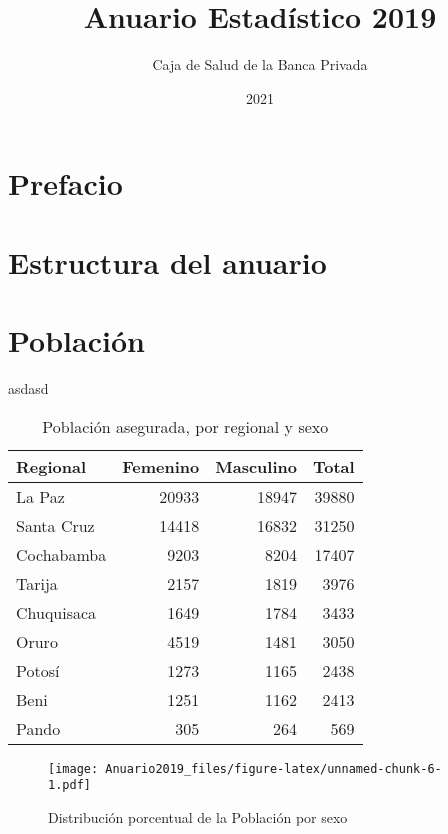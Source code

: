 \documentclass[
]{book}
\title{Anuario Estadístico 2019}
\author{Caja de Salud de la Banca Privada}
\date{2021}
\begin{document}
\maketitle

{
\setcounter{tocdepth}{1}
\tableofcontents
}
\hypertarget{prefacio}{%
\chapter*{Prefacio}\label{prefacio}}

\hypertarget{estructura-del-anuario}{%
\chapter*{Estructura del anuario}\label{estructura-del-anuario}}

\hypertarget{poblaciuxf3n}{%
\chapter{Población}\label{poblaciuxf3n}}

asdasd

\begin{table}

\caption{\label{tab:unnamed-chunk-4}Población asegurada, por regional y sexo}
\centering
\begin{tabular}[t]{lrrr}
\toprule
Regional & Femenino & Masculino & Total\\
\midrule
La Paz & 20933 & 18947 & 39880\\
Santa Cruz & 14418 & 16832 & 31250\\
Cochabamba & 9203 & 8204 & 17407\\
Tarija & 2157 & 1819 & 3976\\
Chuquisaca & 1649 & 1784 & 3433\\
\addlinespace
Oruro & 4519 & 1481 & 3050\\
Potosí & 1273 & 1165 & 2438\\
Beni & 1251 & 1162 & 2413\\
Pando & 305 & 264 & 569\\
\bottomrule
\end{tabular}
\end{table}

\begin{figure}
\centering
\texttt{[image: Anuario2019\_files/figure-latex/unnamed-chunk-6-1.pdf]}
\caption{\label{fig:unnamed-chunk-6}Distribución porcentual de la Población por sexo}
\end{figure}
\end{document}
